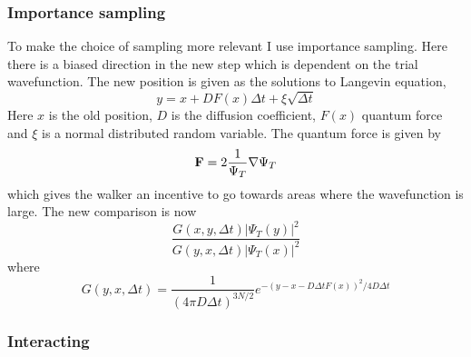 \documentclass[12pt]{article}
\begin{document}
  \subsubsection{Importance sampling}
  To make the choice of sampling more relevant I use importance sampling.
  Here there is a biased direction in the new step which is dependent on the trial wavefunction.
  The new position is given as the solutions to Langevin equation,
  \begin{equation}
    y = x + DF(x)\Delta t + \xi\sqrt{\Delta t}
  \end{equation}
  Here $x$ is the old position, $D$ is the diffusion coefficient, $F(x)$ quantum force and $\xi$
  is a normal distributed random variable.
  The quantum force is given by 
  \begin{equation}
    {\bf F}= 2\frac{1}{\Psi_T}\nabla\Psi_T
  \end{equation}
  which gives the walker an incentive to go towards areas where the wavefunction is large.
  The new comparison is now
  \begin{equation}
    \frac{G(x,y,\Delta t)|\Psi_T(y)|^2}{G(y,x,\Delta t)|\Psi_T(x)|^2}
  \end{equation}
  where 
  \[ G(y,x,\Delta t) = \frac{1}{(4\pi D\Delta t)^{3N/2}}e^{-(y-x-D\Delta tF(x))^2/4D\Delta t}\]
  \subsubsection{Interacting}

  

  
  \newpage
  \appendix
  
\end{document}
